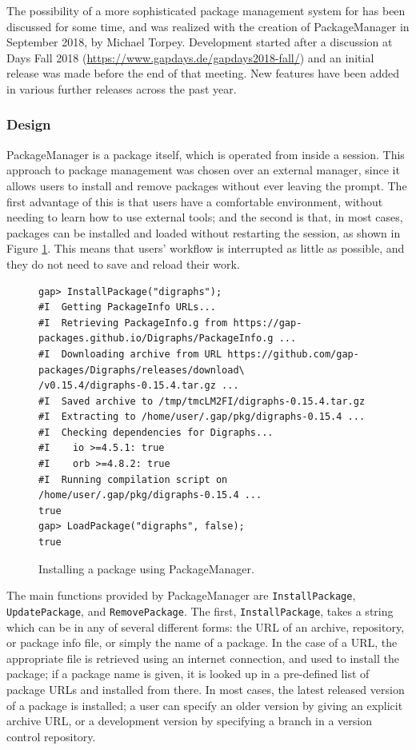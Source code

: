 \documentclass{deliverablereport}
\begin{document}
The possibility of a more sophisticated package management system for \GAP has
been discussed for some time, and was realized with the creation of {\sf
  PackageManager} \cite{PackageManager} in
September 2018, by Michael Torpey.  Development started after a discussion at
\GAP Days Fall 2018 (\url{https://www.gapdays.de/gapdays2018-fall/}) and an
initial release was made before the end of that meeting.  New features have been
added in various further releases across the past year.

\subsubsection{Design}

{\sf PackageManager} is a \GAP package itself, which is operated from inside a
\GAP session.  This approach to package management was chosen over an external
manager, since it allows users to install and remove packages without ever
leaving the \GAP prompt.  The first advantage of this is that
users have a comfortable environment, without needing to learn how to use
external tools; and the second is that, in most cases, packages can be installed
and loaded without restarting the session, as shown in Figure \ref{fig:pkgman-sample}.
This means that users' workflow is interrupted as little as possible, and they do
not need to save and reload their work.

\begin{figure}[!ht]
    \centering
    {\tiny
\begin{verbatim}
gap> InstallPackage("digraphs");
#I  Getting PackageInfo URLs...
#I  Retrieving PackageInfo.g from https://gap-packages.github.io/Digraphs/PackageInfo.g ...
#I  Downloading archive from URL https://github.com/gap-packages/Digraphs/releases/download\
/v0.15.4/digraphs-0.15.4.tar.gz ...
#I  Saved archive to /tmp/tmcLM2FI/digraphs-0.15.4.tar.gz
#I  Extracting to /home/user/.gap/pkg/digraphs-0.15.4 ...
#I  Checking dependencies for Digraphs...
#I    io >=4.5.1: true
#I    orb >=4.8.2: true
#I  Running compilation script on /home/user/.gap/pkg/digraphs-0.15.4 ...
true
gap> LoadPackage("digraphs", false);
true
\end{verbatim}
    }
    \caption{Installing a package using {\sf PackageManager}.}
    \label{fig:pkgman-sample}
\end{figure}

The main functions provided by {\sf PackageManager} are \texttt{InstallPackage},
\texttt{UpdatePackage}, and \texttt{RemovePackage}.  The first,
\texttt{InstallPackage}, takes a string which can be in any of several different
forms: the URL of an archive, repository, or package info file, or simply the
name of a package.  In the case of a URL, the appropriate file is retrieved
using an internet connection, and used to install the package; if a package name
is given, it is looked up in a pre-defined list of package URLs and installed
from there.  In most cases, the latest released version of a package is
installed; a user can specify an older version by giving an explicit archive
URL, or a development version by specifying a branch in a
version control repository.  %
\end{document}
